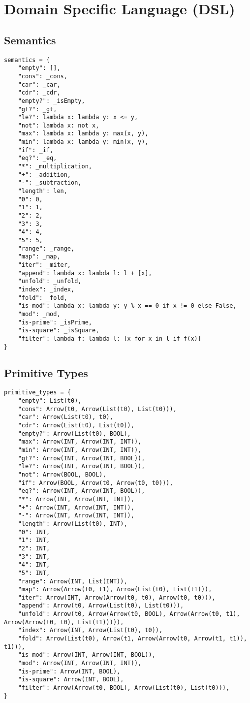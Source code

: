 
\section{Domain Specific Language (DSL)} \label{app:dsl}

\subsection{Semantics}
\begin{lstlisting}[style=mypy, breaklines=true]
    semantics = {
    "empty": [],
    "cons": _cons,
    "car": _car,
    "cdr": _cdr,
    "empty?": _isEmpty,
    "gt?": _gt,
    "le?": lambda x: lambda y: x <= y,
    "not": lambda x: not x,
    "max": lambda x: lambda y: max(x, y),
    "min": lambda x: lambda y: min(x, y),
    "if": _if,
    "eq?": _eq,
    "*": _multiplication,
    "+": _addition,
    "-": _subtraction,
    "length": len,
    "0": 0,
    "1": 1,
    "2": 2,
    "3": 3,
    "4": 4,
    "5": 5,
    "range": _range,
    "map": _map,
    "iter": _miter,
    "append": lambda x: lambda l: l + [x],
    "unfold": _unfold,
    "index": _index,
    "fold": _fold,
    "is-mod": lambda x: lambda y: y % x == 0 if x != 0 else False,
    "mod": _mod,
    "is-prime": _isPrime,
    "is-square": _isSquare,
    "filter": lambda f: lambda l: [x for x in l if f(x)]
}
\end{lstlisting}

\clearpage
\subsection{Primitive Types}
\begin{lstlisting}[style=mypy, breaklines=true]
    primitive_types = {
    "empty": List(t0),
    "cons": Arrow(t0, Arrow(List(t0), List(t0))),
    "car": Arrow(List(t0), t0),
    "cdr": Arrow(List(t0), List(t0)),
    "empty?": Arrow(List(t0), BOOL),
    "max": Arrow(INT, Arrow(INT, INT)),
    "min": Arrow(INT, Arrow(INT, INT)),
    "gt?": Arrow(INT, Arrow(INT, BOOL)),
    "le?": Arrow(INT, Arrow(INT, BOOL)),
    "not": Arrow(BOOL, BOOL),
    "if": Arrow(BOOL, Arrow(t0, Arrow(t0, t0))),
    "eq?": Arrow(INT, Arrow(INT, BOOL)),
    "*": Arrow(INT, Arrow(INT, INT)),
    "+": Arrow(INT, Arrow(INT, INT)),
    "-": Arrow(INT, Arrow(INT, INT)),
    "length": Arrow(List(t0), INT),
    "0": INT,
    "1": INT,
    "2": INT,
    "3": INT,
    "4": INT,
    "5": INT,
    "range": Arrow(INT, List(INT)),
    "map": Arrow(Arrow(t0, t1), Arrow(List(t0), List(t1))),
    "iter": Arrow(INT, Arrow(Arrow(t0, t0), Arrow(t0, t0))),
    "append": Arrow(t0, Arrow(List(t0), List(t0))),
    "unfold": Arrow(t0, Arrow(Arrow(t0, BOOL), Arrow(Arrow(t0, t1), Arrow(Arrow(t0, t0), List(t1))))),
    "index": Arrow(INT, Arrow(List(t0), t0)),
    "fold": Arrow(List(t0), Arrow(t1, Arrow(Arrow(t0, Arrow(t1, t1)), t1))),
    "is-mod": Arrow(INT, Arrow(INT, BOOL)),
    "mod": Arrow(INT, Arrow(INT, INT)),
    "is-prime": Arrow(INT, BOOL),
    "is-square": Arrow(INT, BOOL),
    "filter": Arrow(Arrow(t0, BOOL), Arrow(List(t0), List(t0))),
}
\end{lstlisting}

